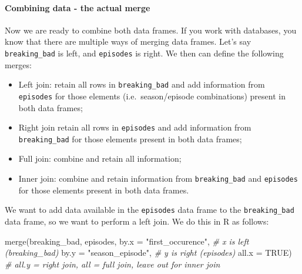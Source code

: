 \documentclass[
]{article}
\newenvironment{Shaded}{\begin{snugshade}}{\end{snugshade}}
\newcommand{\AttributeTok}[1]{\textcolor[rgb]{0.77,0.63,0.00}{#1}}
\newcommand{\CommentTok}[1]{\textcolor[rgb]{0.56,0.35,0.01}{\textit{#1}}}
\newcommand{\ConstantTok}[1]{\textcolor[rgb]{0.00,0.00,0.00}{#1}}
\newcommand{\FunctionTok}[1]{\textcolor[rgb]{0.00,0.00,0.00}{#1}}
\newcommand{\NormalTok}[1]{#1}
\newcommand{\StringTok}[1]{\textcolor[rgb]{0.31,0.60,0.02}{#1}}
\begin{document}
\hypertarget{combining-data---the-actual-merge}{%
\paragraph{Combining data - the actual
merge}\label{combining-data---the-actual-merge}}

Now we are ready to combine both data frames. If you work with
databases, you know that there are multiple ways of merging data frames.
Let's say \texttt{breaking\_bad} is left, and \texttt{episodes} is
right. We then can define the following merges:

\begin{itemize}
\item
  Left join: retain all rows in \texttt{breaking\_bad} and add
  information from \texttt{episodes} for those elements
  (i.e.~season/episode combinations) present in both data frames;
\item
  Right join retain all rows in \texttt{episodes} and add information
  from \texttt{breaking\_bad} for those elements present in both data
  frames;
\item
  Full join: combine and retain all information;
\item
  Inner join: combine and retain information from \texttt{breaking\_bad}
  and \texttt{episodes} for those elements present in both data frames.
\end{itemize}

We want to add data available in the \texttt{episodes} data frame to the
\texttt{breaking\_bad} data frame, so we want to perform a left join. We
do this in R as follows:

\begin{Shaded}
\begin{Highlighting}[]
\FunctionTok{merge}\NormalTok{(breaking\_bad, episodes, }
      \AttributeTok{by.x =} \StringTok{"first\_occurence"}\NormalTok{, }\CommentTok{\# x is left (breaking\_bad)}
      \AttributeTok{by.y =} \StringTok{"season\_episode"}\NormalTok{, }\CommentTok{\# y is right (episodes)}
      \AttributeTok{all.x =} \ConstantTok{TRUE}\NormalTok{) }\CommentTok{\# all.y = right join, all = full join, leave out for inner join}
\end{Highlighting}
\end{Shaded}
\end{document}
